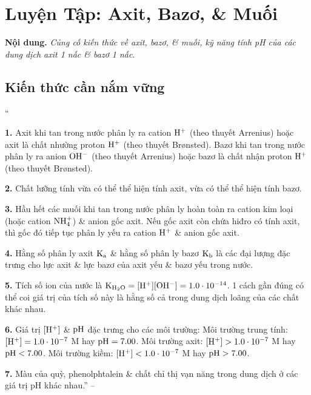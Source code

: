 \documentclass[oneside]{book}
\numberwithin{equation}{section}
\begin{document}

\section{Luyện Tập: Axit, Bazơ, \& Muối}
\textbf{Nội dung.} \textit{Củng cố kiến thức về axit, bazơ, \& muối, kỹ năng tính pH của các dung dịch axit 1 nấc \& bazơ 1 nấc}.

\subsection{Kiến thức cần nắm vững}
``\begin{enumerate*}
	\item[\textbf{1.}] Axit khi tan trong nước phân ly ra cation $\rm H^+$ (theo thuyết Arrenius) hoặc axit là chất nhường proton $\rm H^+$ (theo thuyết Br\o nsted). Bazơ khi tan trong nước phân ly ra anion $\rm OH^-$ (theo thuyết Arrenius) hoặc bazơ là chất nhận proton $\rm H^+$ (theo thuyết Br\o nsted).
	\item[\textbf{2.}] Chất lưỡng tính vừa có thể thể hiện tính axit, vừa có thể thể hiện tính bazơ.
	\item[\textbf{3.}] Hầu hết các muối khi tan trong nước phân ly hoàn toàn ra cation kim loại (hoặc cation $\rm NH_4^+$) \& anion gốc axit. Nếu gốc axit còn chứa hiđro có tính axit, thì gốc đó tiếp tục phân ly yếu ra cation $\rm H^+$ \& anion gốc axit.
	\item[\textbf{4.}] Hằng số phân ly axit $\rm K_a$ \& hằng số phân ly bazơ $\rm K_b$ là các đại lượng đặc trưng cho lực axit \& lực bazơ của axit yếu \& bazơ yếu trong nước. 
	\item[\textbf{5.}] Tích số ion của nước là $\rm K_{H_2O} = [H^+][OH^-] = 1.0\cdot 10^{-14}$. 1 cách gần đúng có thể coi giá trị của tích số này là hằng số cả trong dung dịch loãng của các chất khác nhau.
	\item[\textbf{6.}] Giá trị $\rm[H^+]$ \& $\rm pH$ đặc trưng cho các môi trường: Môi trường trung tính: $\rm[H^+] = 1.0\cdot 10^{-7}$ M hay $\rm pH = 7.00$. Môi trường axit: $\rm[H^+] > 1.0\cdot 10^{-7}$ M hay $\rm pH < 7.00$. Môi trường kiềm: $\rm[H^+] < 1.0\cdot 10^{-7}$ M hay $\rm pH > 7.00$.
	\item[\textbf{7.}] Màu của quỳ, phenolphtalein \& chất chỉ thị vạn năng trong dung dịch ở các giá trị pH khác nhau.'' -- \cite[p. 22]{SGK_Hoa_Hoc_11_nang_cao}
\end{enumerate*}
\end{document}
